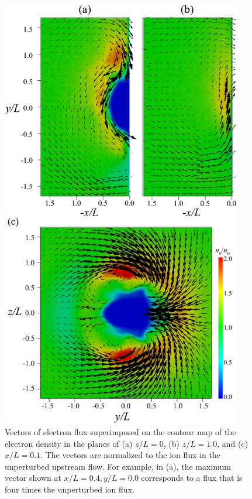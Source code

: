 \documentclass[draft,jgrga]{agutex2015}
\begin{document}
\begin{article}
\begin{figure}[h]
\centering
\noindent\includegraphics[width=10.5cm]{./figures/Fig_6_bb-crop.pdf}
\caption{
Vectors of electron flux superimposed on the contour map 
of the electron density in the planes of (a) $z/L=0$, (b) $z/L=1.0$, and (c) $x/L=0.1$.
The vectors are normalized to the ion flux in the unperturbed upstream flow.
For example, in (a), the maximum vector shown at $x/L=0.4, y/L=0.0$
corresponds to a flux that is four times the unperturbed ion flux.
}
\label{fig:6}
\end{figure}


\end{article}
\end{document}
